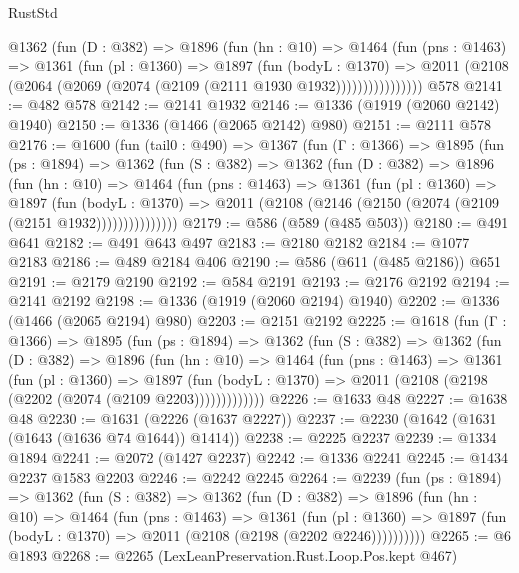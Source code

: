 \begin{lexlean}{RustStd}
\begin{coremodule}
{\begin{coremodule}
{{{{{{{{{{{{{{            @1362
              (fun (D : @382) =>
              @1896
                (fun (hn : @10) =>
                @1464
                  (fun (pns : @1463) =>
                  @1361
                    (fun (pl : @1360) =>
                    @1897
                      (fun (bodyL : @1370) =>
                      @2011 (@2108 (@2064 (@2069 (@2074 (@2109 (@2111 @1930 @1932))))))))))))))))
    @578
@2141 := @482 @578
@2142 := @2141 @1932
@2146 := @1336 (@1919 (@2060 @2142) @1940)
@2150 := @1336 (@1466 (@2065 @2142) @980)
@2151 := @2111 @578
@2176 := @1600
    (fun (tail0 : @490) =>
    @1367
      (fun (Γ : @1366) =>
      @1895
        (fun (ps : @1894) =>
        @1362
          (fun (S : @382) =>
          @1362
            (fun (D : @382) =>
            @1896
              (fun (hn : @10) =>
              @1464
                (fun (pns : @1463) =>
                @1361
                  (fun (pl : @1360) =>
                  @1897
                    (fun (bodyL : @1370) =>
                    @2011 (@2108 (@2146 (@2150 (@2074 (@2109 (@2151 @1932)))))))))))))))
@2179 := @586 (@589 (@485 @503))
@2180 := @491 @641
@2182 := @491 @643 @497
@2183 := @2180 @2182
@2184 := @1077 @2183
@2186 := @489 @2184 @406
@2190 := @586 (@611 (@485 @2186)) @651
@2191 := @2179 @2190
@2192 := @584 @2191
@2193 := @2176 @2192
@2194 := @2141 @2192
@2198 := @1336 (@1919 (@2060 @2194) @1940)
@2202 := @1336 (@1466 (@2065 @2194) @980)
@2203 := @2151 @2192
@2225 := @1618
    (fun (Γ : @1366) =>
    @1895
      (fun (ps : @1894) =>
      @1362
        (fun (S : @382) =>
        @1362
          (fun (D : @382) =>
          @1896
            (fun (hn : @10) =>
            @1464
              (fun (pns : @1463) =>
              @1361
                (fun (pl : @1360) =>
                @1897
                  (fun (bodyL : @1370) =>
                  @2011 (@2108 (@2198 (@2202 (@2074 (@2109 @2203)))))))))))))
@2226 := @1633 @48
@2227 := @1638 @48
@2230 := @1631 (@2226 (@1637 @2227))
@2237 := @2230 (@1642 (@1631 (@1643 (@1636 @74 @1644)) @1414))
@2238 := @2225 @2237
@2239 := @1334 @1894
@2241 := @2072 (@1427 @2237)
@2242 := @1336 @2241
@2245 := @1434 @2237 @1583 @2203
@2246 := @2242 @2245
@2264 := @2239
    (fun (ps : @1894) =>
    @1362
      (fun (S : @382) =>
      @1362
        (fun (D : @382) =>
        @1896
          (fun (hn : @10) =>
          @1464
            (fun (pns : @1463) =>
            @1361
              (fun (pl : @1360) =>
              @1897 (fun (bodyL : @1370) => @2011 (@2108 (@2198 (@2202 @2246))))))))))
@2265 := @6 @1893
@2268 := @2265 (LexLeanPreservation.Rust.Loop.Pos.kept @467)
}}}}}}}}}}}}}}
\end{coremodule}}
\end{coremodule}
\end{lexlean}
